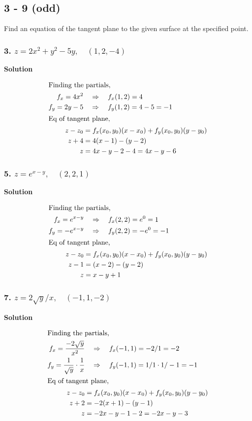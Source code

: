 \documentclass{article}
\newcommand\rr{\quad\Rightarrow\quad}
\newcommand{\solution}{\centerline{\textbf{Solution}}}
\begin{document}
\subsection*{3 - 9 (odd)}
Find an equation of the tangent plane to the given surface at the specified point.
\subsubsection*{3. $z = 2x^2 + y^2 - 5y, \quad (1, 2, -4)$}
\solution 
\begin{align*}
    \intertext{Finding the partials,}
    f_x = 4x^2 &\rr f_x(1,2) = 4 \\
    f_y = 2y-5 &\rr f_y(1,2) = 4-5 = -1 \\
    \intertext{Eq of tangent plane,}
    z-z_0 &= f_x(x_0, y_0)(x-x_0) + f_y(x_0, y_0)(y-y_0) \\
    z+4 &= 4(x-1) - (y-2) \\
    z &= 4x - y - 2 -4 = 4x - y - 6
\end{align*}
\subsubsection*{5. $z = e^{x-y},\quad (2,2,1)$}
\solution 
\begin{align*}
    \intertext{Finding the partials,}
    f_x = e^{x-y} &\rr f_x(2,2) = e^0 = 1 \\
    f_y = -e^{x-y} &\rr f_y(2,2) = -e^0 = -1 \\
    \intertext{Eq of tangent plane,}
    z-z_0 &= f_x(x_0, y_0)(x-x_0) + f_y(x_0, y_0)(y-y_0) \\
    z-1 &= (x-2) - (y-2) \\
    z &= x-y+1
\end{align*}
\subsubsection*{7. $z = 2\sqrt y / x,\quad (-1,1,-2)$}
\solution 
\begin{align*}
    \intertext{Finding the partials,}
    f_x = \frac{-2\sqrt y}{x^2} &\rr f_x(-1,1) = -2/1 = -2 \\
    f_y = \frac 1 {\sqrt y} \cdot \frac 1 x &\rr f_y(-1,1) = 1/1 \cdot 1/-1 = -1 \\
    \intertext{Eq of tangent plane,}
    z-z_0 &= f_x(x_0, y_0)(x-x_0) + f_y(x_0, y_0)(y-y_0) \\
    z+2 &= -2(x+1) - (y-1) \\
    z &= -2x - y - 1 - 2 = -2x - y - 3
\end{align*}
\end{document}
